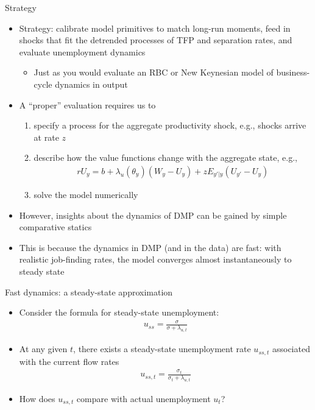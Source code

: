 \documentclass[9pt]{beamer}
\newcommand{\bit}{\begin{itemize}}
\newcommand{\eit}{\end{itemize}}
\newcommand{\ben}{\begin{enumerate}}
\newcommand{\een}{\end{enumerate}}
\begin{document}
\begin{frame}{Strategy}

\bit
\setlength\itemsep{1.5em}

\item Strategy: calibrate model primitives to match long-run moments, feed in shocks that fit the detrended processes of TFP and separation rates, and evaluate unemployment dynamics
\bit
\item Just as you would evaluate an RBC or New Keynesian model of business-cycle dynamics in output
\eit

\item A ``proper'' evaluation requires us to
\ben
\item specify a process for the aggregate productivity shock, e.g., shocks arrive at rate $z$
\item describe how the value functions change with the aggregate state, e.g., 
\begin{eqnarray}
r U_{y} =  b  +  \lambda_u(\theta_{y}) \left( W_{y} - U_{y} \right) + z E_{y'|y} (U_{y'}- U_{y})  \nonumber
\end{eqnarray}
\item solve the model numerically
\een


\item However, insights about the dynamics of DMP can be gained by simple comparative statics

\item This is because the dynamics in DMP (and in the data) are fast: with realistic job-finding rates, the model converges almost instantaneously to steady state

\eit
\end{frame}


\begin{frame}{Fast dynamics: a steady-state approximation}

\bit
\setlength\itemsep{1.5em}

\item Consider the formula for steady-state unemployment:
\begin{eqnarray}
u_{ss} = \frac{\sigma}{\sigma + \lambda_{u,t}} \nonumber 
\end{eqnarray}

\item At any given $t$, there exists a steady-state unemployment rate $u_{ss,t}$ associated with the current flow rates
\begin{eqnarray}
u_{ss, t} = \frac{\sigma_t}{\sigma_t + \lambda_{u,t}} \nonumber 
\end{eqnarray}

\item How does $u_{ss, t}$ compare with actual unemployment $u_t$?


\eit
\end{frame}
\end{document}

